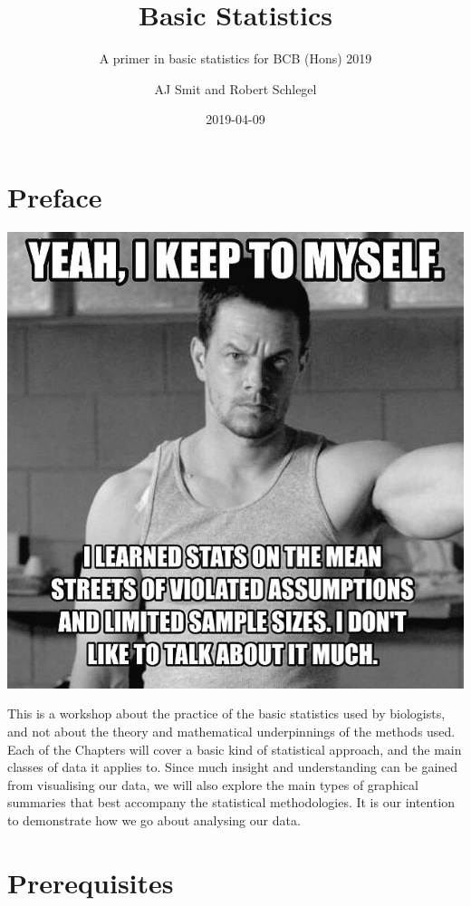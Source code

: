 \documentclass[english,10pt,a4paper,oneside]{book}
\title{Basic Statistics}
\subtitle{\sf A primer in basic statistics for BCB (Hons) 2019}
\author{AJ Smit and Robert Schlegel}
\date{2019-04-09}
\begin{document}
\maketitle



{
\hypersetup{linkcolor=black}
\setcounter{tocdepth}{2}
\tableofcontents
}

\listoftables

\listoffigures

\hypertarget{preface}{%
\chapter*{Preface}\label{preface}}


\includegraphics[width=0.7\linewidth]{figures/walberg_assumptions}

This is a workshop about the practice of the basic statistics used by biologists, and not about the theory and mathematical underpinnings of the methods used. Each of the Chapters will cover a basic kind of statistical approach, and the main classes of data it applies to. Since much insight and understanding can be gained from visualising our data, we will also explore the main types of graphical summaries that best accompany the statistical methodologies. It is our intention to demonstrate how we go about analysing our data.

\hypertarget{prerequisites}{%
\chapter*{Prerequisites}\label{prerequisites}}
\end{document}
